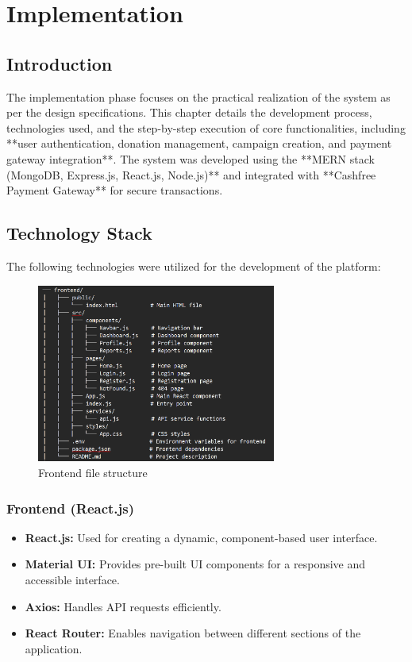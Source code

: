 \chapter{Implementation}

\section{Introduction}
The implementation phase focuses on the practical realization of the system as per the design specifications. This chapter details the development process, technologies used, and the step-by-step execution of core functionalities, including **user authentication, donation management, campaign creation, and payment gateway integration**. The system was developed using the **MERN stack (MongoDB, Express.js, React.js, Node.js)** and integrated with **Cashfree Payment Gateway** for secure transactions.

\section{Technology Stack}
The following technologies were utilized for the development of the platform:

\begin{figure}[h]
    \centering
    \includegraphics[width=0.7\textwidth]{images/frontend_file_structure.png}
    \caption{Frontend file structure}
    \label{fig:frontend file structure}
\end{figure}

\subsection{Frontend (React.js)}
\begin{itemize}
    \item \textbf{React.js:} Used for creating a dynamic, component-based user interface.
    \item \textbf{Material UI:} Provides pre-built UI components for a responsive and accessible interface.
    \item \textbf{Axios:} Handles API requests efficiently.
    \item \textbf{React Router:} Enables navigation between different sections of the application.
\end{itemize}


